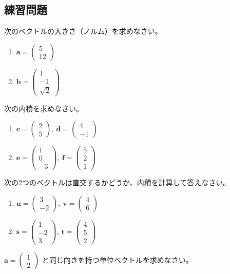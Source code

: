 \subsection{練習問題}
\begin{quiz}
次のベクトルの大きさ（ノルム）を求めなさい。
\begin{enumerate}
\item $\bm{a} = \begin{pmatrix} 5 \\ 12 \end{pmatrix}$
\item $\bm{b} = \begin{pmatrix} 1 \\ -1 \\ \sqrt{2} \end{pmatrix}$
\end{enumerate}
\end{quiz}

\begin{quiz}
次の内積を求めなさい。
\begin{enumerate}
\item $\bm{c} = \begin{pmatrix} 2 \\ 5 \end{pmatrix},\ \bm{d} = \begin{pmatrix} 4 \\ -1 \end{pmatrix}$
\item $\bm{e} = \begin{pmatrix} 1 \\ 0 \\ -3 \end{pmatrix},\ \bm{f} = \begin{pmatrix} 5 \\ 2 \\ 1 \end{pmatrix}$
\end{enumerate}
\end{quiz}

\begin{quiz}
次の2つのベクトルは直交するかどうか、内積を計算して答えなさい。
\begin{enumerate}
\item $\bm{u} = \begin{pmatrix} 3 \\ -2 \end{pmatrix},\ \bm{v} = \begin{pmatrix} 4 \\ 6 \end{pmatrix}$
\item $\bm{s} = \begin{pmatrix} 1 \\ -2 \\ 3 \end{pmatrix},\ \bm{t} = \begin{pmatrix} 4 \\ 5 \\ 2 \end{pmatrix}$
\end{enumerate}
\end{quiz}

\begin{quiz}
$\bm{a} = \begin{pmatrix} 1 \\ 2 \end{pmatrix}$ と同じ向きを持つ単位ベクトルを求めなさい。
\end{quiz}